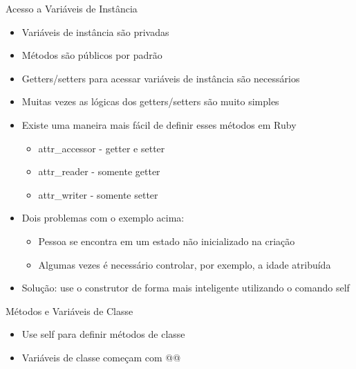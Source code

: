 \begin{frame}{Acesso a Variáveis de Instância}    
  \begin{itemize}
    \item Variáveis de instância são \alert{privadas}
    \item Métodos são públicos por padrão
    \item Getters/setters para acessar variáveis de instância são necessários
  \end{itemize}  
  
  
  \begin{itemize}
    \item Muitas vezes as lógicas dos getters/setters são muito simples
    \item Existe uma maneira mais fácil de definir esses métodos em Ruby
    \begin{itemize}
      \item \alert{attr\_accessor} - getter e setter
      \item \alert{attr\_reader} - somente getter
      \item \alert{attr\_writer} - somente setter
    \end{itemize}
  \end{itemize}  
  

  \begin{itemize}
    \item \alert{Dois problemas} com o exemplo acima:
    \begin{itemize}
      \item Pessoa se encontra em um estado não inicializado na criação
      \item Algumas vezes é necessário controlar, por exemplo, a idade atribuída
    \end{itemize}
    \item \alert{Solução}: use o construtor de forma mais inteligente utilizando o comando \alert{self}
  \end{itemize}  
  
 
\end{frame}

\begin{frame}{Métodos e Variáveis de Classe}    
  \begin{itemize}
    \item Use \alert{self} para definir métodos de classe
    \item Variáveis de classe começam com \alert{@@}
  \end{itemize}  
  
 
\end{frame}

